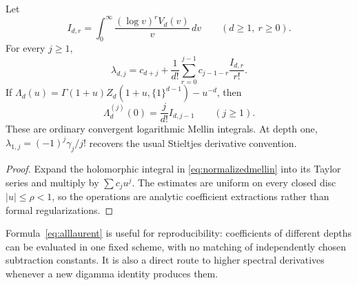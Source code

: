 \begin{corollary}
\label{cor:allcoefficients}
Let
\[
 I_{d,r}=\int_0^\infty \frac{(\log v)^r V_d(v)}v\,dv
 \qquad(d\ge1,\ r\ge0).
\]
For every $j\ge1$,
\begin{equation}\label{eq:alllaurent}
 \lambda_{d,j}=c_{d+j}
  +\frac1{d!}\sum_{r=0}^{j-1}
       c_{j-1-r}\frac{I_{d,r}}{r!}.
\end{equation}
If $\Lambda_d(u)=\Gamma(1+u)Z_d(1+u,\{1\}^{d-1})-u^{-d}$,
then
\begin{equation}\label{eq:normalizedderivatives}
 \Lambda_d^{(j)}(0)=\frac{j}{d!}I_{d,j-1}\qquad(j\ge1).
\end{equation}
These are ordinary convergent logarithmic Mellin integrals. At depth
one, $\lambda_{1,j}=(-1)^j\gamma_j/j!$ recovers the usual Stieltjes
derivative convention.
\end{corollary}
\begin{proof}
Expand the holomorphic integral in \eqref{eq:normalizedmellin} into
its Taylor series and multiply by $\sum c_ju^j$. The estimates are
uniform on every closed disc $|u|\le\rho<1$, so the operations are
analytic coefficient extractions rather than formal regularizations.
\end{proof}

Formula~\eqref{eq:alllaurent} is useful for reproducibility: coefficients
of different depths can be evaluated in one fixed scheme, with no
matching of independently chosen subtraction constants. It is also a
direct route to higher spectral derivatives whenever a new digamma
identity produces them.
